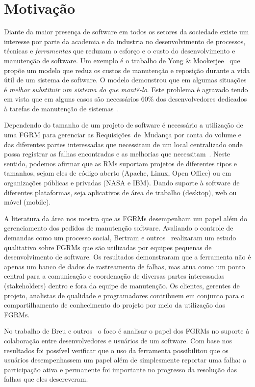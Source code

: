 \section{Motivação}
\label{sec:intro-motivacao}

Diante da maior presença de software em todos os setores da sociedade existe um
interesse por parte da academia e da industria no desenvolvimento de processos,
técnicas e \textit{ferramentas} que reduzam o esforço e o custo do
desenvolvimento e manutenção de software. Um exemplo é o trabalho de Yong \&
Mookerjee~\cite{1423995} que propõe um modelo que reduz os custos de manutenção
e reposição durante a vida útil de um sistema de software. O modelo demonstrou
que em algumas situações é \textit{melhor substituir um sistema do que
    mantê-lo}.  Este pro\-ble\-ma é agravado tendo em vista que em alguns casos
são necessários 60\% dos desenvolvedores dedicados à tarefas de manutenção de
sistemas~\cite{Zhang_2003}.

Dependendo do tamanho de um projeto de software é necessário a utilização de uma
FGRM para gerenciar as Requisições~de~Mudança por conta do volume e das
diferentes partes interessadas que necessitam de um local centralizado onde
possa registrar as falhas encontradas e as melhorias que
necessitam~\cite{1407819}. Neste sentido, podemos afirmar que as RMs suportam
projetos de diferentes tipos e tamanhos, sejam eles de código aberto (Apache,
Linux, Open Office) ou em organizações públicas e privadas (NASA e IBM). Dando
suporte à software de diferentes plataformas, seja aplicativos de área de
trabalho (desktop), web ou móvel (mobile).

A literatura da área nos mostra que as FGRMs desempenham um papel além do
gerenciamento dos pedidos de manutenção software. Avaliando o controle de
demandas como um processo social, Bertram e
outros~\cite{Bertram:2010:CCB:1718918.1718972} realizaram um estudo qualitativo
sobre FGRMs que são utilizadas por equipes pequenas de desenvolvimento de
software. Os resultados demonstraram que a ferramenta não é apenas um banco de
dados de rastreamento de falhas, mas atua como um ponto central para a
comunicação e coordenação de diversas partes interessadas (stakeholders) dentro
e fora da equipe de manutenção. Os clientes, gerentes de projeto, analistas de
qualidade e programadores contribuem em conjunto para o compartilhamento de
conhecimento do projeto por meio da utilização das FGRMs.

No trabalho de Breu e outros~\cite{Breu:2010:INB:1718918.1718973} o foco é
analisar o papel dos FGRMs no suporte à colaboração entre desenvolvedores e
usuários de um software. Com base nos resultados foi possível verificar que o
uso da ferramenta possibilitou que os usuários desempenhassem um papel além de
simplesmente reportar uma falha: a participação ativa e permanente foi
importante no progresso da resolução das falhas que eles descreveram.


